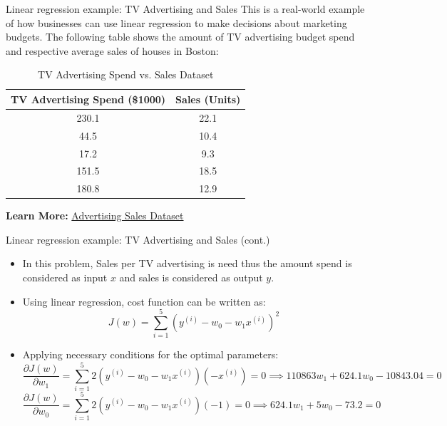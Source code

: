 \documentclass[serif, aspectratio=169]{beamer}
\begin{document}
\begin{frame}{Linear regression example: TV Advertising and Sales}
    This is a real-world example of how businesses can use linear regression to make decisions about marketing budgets. The following table shows the amount of TV advertising budget spend and respective average sales of houses in Boston:
    \begin{table}[h!]
    \centering
    \begin{tabular}{|c|c|}
    \hline
    \textbf{TV Advertising Spend (\$1000)} & \textbf{Sales (Units)} \\ \hline
    230.1                                  & 22.1                   \\ \hline
    44.5                                   & 10.4                   \\ \hline
    17.2                                   & 9.3                    \\ \hline
    151.5                                  & 18.5                   \\ \hline
    180.8                                  & 12.9                   \\ \hline
    \end{tabular}
    \caption{TV Advertising Spend vs. Sales Dataset}
    \end{table}
    
\textbf{Learn More:}
\href{https://www.kaggle.com/datasets/yasserh/advertising-sales-dataset}{Advertising Sales Dataset}
\end{frame}





\begin{frame}{Linear regression example: TV Advertising and Sales (cont.)}
    \begin{itemize}
        \item In this problem, Sales per TV advertising is need thus the amount spend is considered as input \( x \) and sales is considered as output \( y \). 
        \item Using linear regression, cost function can be written as:
        \[
        J(w) = \sum_{i=1}^{5} \left( y^{(i)} - w_0 - w_1 x^{(i)} \right)^2
        \]
        \item Applying necessary conditions for the optimal parameters:
        \[ 
        \frac{\partial J(w)}{\partial w_1} = \sum_{i=1}^{5} 2 \left( y^{(i)} - w_0 - w_1 x^{(i)} \right) (-x^{(i)}) = 0 \implies 110863 w_1 + 624.1 w_0 - 10843.04 = 0
        \]
        \[
        \frac{\partial J(w)}{\partial w_0} = \sum_{i=1}^{5} 2 \left( y^{(i)} - w_0 - w_1 x^{(i)} \right) (-1) = 0 \implies 624.1 w_1 + 5 w_0 - 73.2 = 0
        \]
    \end{itemize}
\end{frame}
\end{document}
